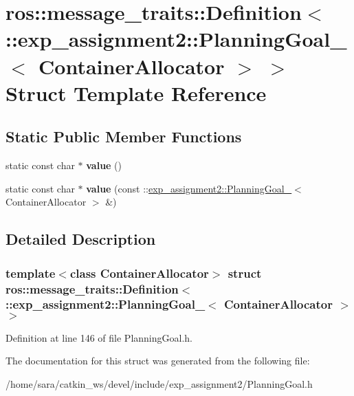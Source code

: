 \hypertarget{structros_1_1message__traits_1_1Definition_3_01_1_1exp__assignment2_1_1PlanningGoal___3_01ContainerAllocator_01_4_01_4}{}\section{ros\+:\+:message\+\_\+traits\+:\+:Definition$<$ \+:\+:exp\+\_\+assignment2\+:\+:Planning\+Goal\+\_\+$<$ Container\+Allocator $>$ $>$ Struct Template Reference}
\label{structros_1_1message__traits_1_1Definition_3_01_1_1exp__assignment2_1_1PlanningGoal___3_01ContainerAllocator_01_4_01_4}
\subsection*{Static Public Member Functions}
\begin{DoxyCompactItemize}
\item 
\mbox{\label{structros_1_1message__traits_1_1Definition_3_01_1_1exp__assignment2_1_1PlanningGoal___3_01ContainerAllocator_01_4_01_4_a2133abad5747e2750aa424c1ba8953b1}} 
static const char $\ast$ {\bfseries value} ()
\item 
\mbox{\label{structros_1_1message__traits_1_1Definition_3_01_1_1exp__assignment2_1_1PlanningGoal___3_01ContainerAllocator_01_4_01_4_a765b16f0badd1a246e5574f8c0a4aa49}} 
static const char $\ast$ {\bfseries value} (const \+::\hyperlink{structexp__assignment2_1_1PlanningGoal__}{exp\+\_\+assignment2\+::\+Planning\+Goal\+\_\+}$<$ Container\+Allocator $>$ \&)
\end{DoxyCompactItemize}


\subsection{Detailed Description}
\subsubsection*{template$<$class Container\+Allocator$>$\newline
struct ros\+::message\+\_\+traits\+::\+Definition$<$ \+::exp\+\_\+assignment2\+::\+Planning\+Goal\+\_\+$<$ Container\+Allocator $>$ $>$}



Definition at line 146 of file Planning\+Goal.\+h.



The documentation for this struct was generated from the following file\+:\begin{DoxyCompactItemize}
\item 
/home/sara/catkin\+\_\+ws/devel/include/exp\+\_\+assignment2/Planning\+Goal.\+h\end{DoxyCompactItemize}
